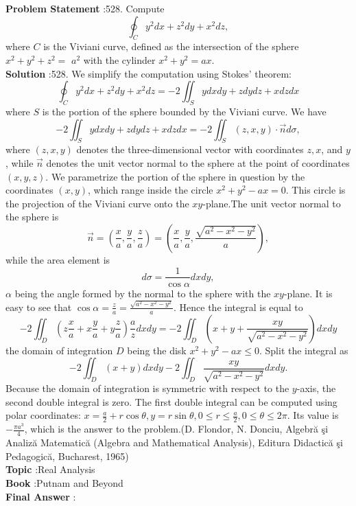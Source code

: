 \documentclass[10pt]{article}
\begin{document}
\textbf{Problem Statement} :528. Compute$$ \oint_{C} y^{2} d x+z^{2} d y+x^{2} d z, $$where $C$ is the Viviani curve, defined as the intersection of the sphere $x^{2}+y^{2}+z^{2}=$ $a^{2}$ with the cylinder $x^{2}+y^{2}=a x$.\\
\textbf{Solution} :528. We simplify the computation using Stokes' theorem:$$ \oint_{C} y^{2} d x+z^{2} d y+x^{2} d z=-2 \iint_{S} y d x d y+z d y d z+x d z d x $$where $S$ is the portion of the sphere bounded by the Viviani curve. We have$$ -2 \iint_{S} y d x d y+z d y d z+x d z d x=-2 \iint_{S}(z, x, y) \cdot \vec{n} d \sigma, $$where $(z, x, y)$ denotes the three-dimensional vector with coordinates $z, x$, and $y$, while $\vec{n}$ denotes the unit vector normal to the sphere at the point of coordinates $(x, y, z)$. We parametrize the portion of the sphere in question by the coordinates $(x, y)$, which range inside the circle $x^{2}+y^{2}-a x=0$. This circle is the projection of the Viviani curve onto the $x y$-plane.The unit vector normal to the sphere is$$ \vec{n}=\left(\frac{x}{a}, \frac{y}{a}, \frac{z}{a}\right)=\left(\frac{x}{a}, \frac{y}{a}, \frac{\sqrt{a^{2}-x^{2}-y^{2}}}{a}\right), $$while the area element is$$ d \sigma=\frac{1}{\cos \alpha} d x d y, $$$\alpha$ being the angle formed by the normal to the sphere with the $x y$-plane. It is easy to see that $\cos \alpha=\frac{z}{a}=\frac{\sqrt{a^{2}-x^{2}-y^{2}}}{a}$. Hence the integral is equal to$$ -2 \iint_{D}\left(z \frac{x}{a}+x \frac{y}{a}+y \frac{z}{a}\right) \frac{a}{z} d x d y=-2 \iint_{D}\left(x+y+\frac{x y}{\sqrt{a^{2}-x^{2}-y^{2}}}\right) d x d y $$the domain of integration $D$ being the disk $x^{2}+y^{2}-a x \leq 0$. Split the integral as$$ -2 \iint_{D}(x+y) d x d y-2 \iint_{D} \frac{x y}{\sqrt{a^{2}-x^{2}-y^{2}}} d x d y . $$Because the domain of integration is symmetric with respect to the $y$-axis, the second double integral is zero. The first double integral can be computed using polar coordinates: $x=\frac{a}{2}+r \cos \theta, y=r \sin \theta, 0 \leq r \leq \frac{a}{2}, 0 \leq \theta \leq 2 \pi$. Its value is $-\frac{\pi a^{3}}{4}$, which is the answer to the problem.(D. Flondor, N. Donciu, Algebră şi Analiză Matematică (Algebra and Mathematical Analysis), Editura Didactică şi Pedagogică, Bucharest, 1965)\\
\textbf{Topic} :Real Analysis\\
\textbf{Book} :Putnam and Beyond\\
\textbf{Final Answer} :\\
\end{document}
